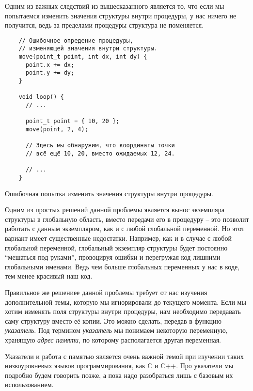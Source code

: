 \documentclass[../sparc.tex]{subfiles}
\begin{document}
Одним из важных следствий из вышесказанного является то, что если мы попытаемся
изменить значения структуры внутри процедуры, у нас ничего не получится, ведь за
пределами процедуры структура не поменяется.

\begin{listing}[H]
  \begin{verbatim}
    // Ошибочное опредение процедуры,
    // изменяющей значения внутри структуры.
    move(point_t point, int dx, int dy) {
      point.x += dx;
      point.y += dy;
    }

    void loop() {
      // ...

      point_t point = { 10, 20 };
      move(point, 2, 4);

      // Здесь мы обнаружим, что координаты точки
      // всё ещё 10, 20, вместо ожидаемых 12, 24.

      // ...
    }
  \end{verbatim}
  \caption{Ошибочная попытка изменить значения структуры внутри процедуры.}
  \label{listing:game-dev-structure-usage-01}
\end{listing}

Одним из простых решений данной проблемы является вынос экземпляра структуры в
глобальную область, вместо передачи его в процедуру -- это позволит работать с
данным экземпляром, как и с любой глобальной переменной.  Но этот вариант имеет
существенные недостатки.  Например, как и в случае с любой глобальной
переменной, глобальный экземпляр структуры будет постоянно ``мешаться под
руками'', провоцируя ошибки и перегружая код лишними глобальными именами.  Ведь
чем больше глобальных переменных у нас в коде, тем менее красивый наш код.

 Правильное же решениее данной проблемы
требует от нас изучения дополнительной темы, которую мы игнорировали до текущего
момента.  Если мы хотим изменять поля структуры внутри процедуры, нам необходимо
передавать саму структуру вместо её копии. Это можно сделать, передав в функцию
\emph{указатель}.  Под термином \emph{указатель} мы понимаем некоторую
переменную, хранящую \emph{адрес памяти}, по которому располагается другая
переменная.

Указатели и работа с памятью является очень важной темой при изучении таких
низкоуровневых языков программирования, как C и C++.  Про указатели мы подробно
будем говорить позже, а пока надо разобраться лишь с базовым их использованием.
\end{document}
